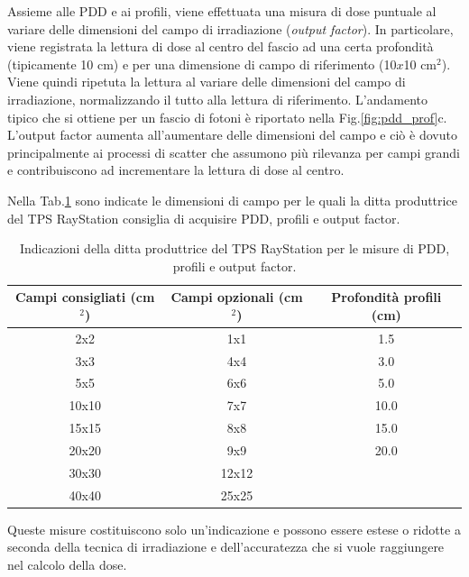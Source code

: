 Assieme alle PDD e ai profili, viene effettuata una misura di dose puntuale al variare delle dimensioni del campo di irradiazione (\textit{output factor}). In particolare, viene registrata la lettura di dose al centro del fascio ad una certa profondità (tipicamente 10 cm) e per una dimensione di campo di riferimento (10$x$10 cm$^2$). Viene quindi ripetuta la lettura al variare delle dimensioni del campo di irradiazione, normalizzando il tutto alla lettura di riferimento. L'andamento tipico che si ottiene per un fascio di fotoni è riportato nella Fig.\ref{fig:pdd_prof}c. L'output factor aumenta all'aumentare delle dimensioni del campo e ciò è dovuto principalmente ai processi di scatter che assumono più rilevanza per campi grandi e contribuiscono ad incrementare la lettura di dose al centro.

Nella Tab.\ref{tab:meas} sono indicate le dimensioni di campo per le quali la ditta produttrice del TPS RayStation consiglia di acquisire PDD, profili e  output factor.
\begin{table}
\begin{tabular}{@{}ccc@{}}
\toprule
Campi consigliati (cm$^2$) & Campi opzionali (cm$^2$) & Profondità profili (cm)\\
\midrule
2x2 & 1x1 & 1.5\\
3x3 & 4x4 & 3.0\\
5x5 & 6x6 & 5.0\\
10x10 & 7x7 & 10.0\\
15x15 & 8x8 & 15.0\\
20x20 & 9x9 & 20.0\\
30x30 & 12x12 & \\
40x40 & 25x25 & \\
\bottomrule
\end{tabular}
\caption{Indicazioni della ditta produttrice del TPS RayStation per le misure di PDD, profili e output factor.}
\label{tab:meas}
\end{table}
Queste misure costituiscono solo un'indicazione e possono essere estese o ridotte a seconda della tecnica di irradiazione e dell'accuratezza che si vuole raggiungere nel calcolo della dose.


